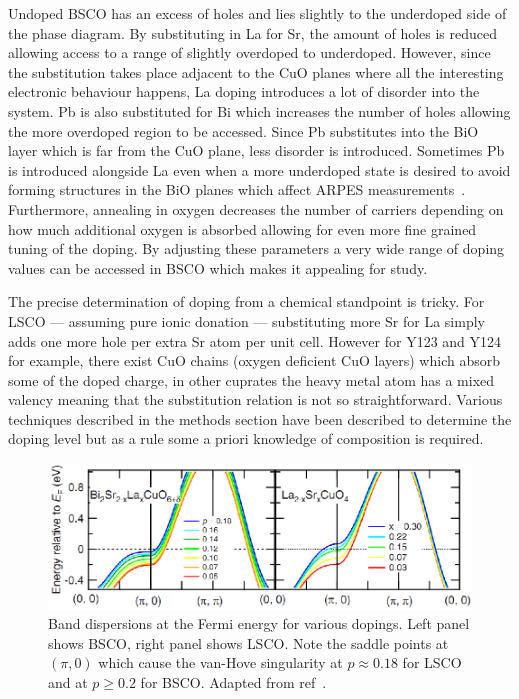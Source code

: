 Undoped \ac{BSCO} has an excess of holes and lies slightly to the underdoped side of the phase diagram. By substituting in La for Sr, the amount of holes is reduced allowing access to a range of slightly overdoped to underdoped. However, since the substitution takes place adjacent to the CuO planes where all the interesting electronic behaviour happens, La doping introduces a lot of disorder into the system. Pb is also substituted for Bi which increases the number of holes allowing the more overdoped region to be accessed. Since Pb substitutes into the BiO layer which is far from the CuO plane, less disorder is introduced. Sometimes Pb is introduced alongside La even when a more underdoped state is desired to avoid forming structures in the BiO planes which affect \ac{ARPES} measurements~\cite{Kondo2007}. Furthermore, annealing in oxygen decreases the number of carriers depending on how much additional oxygen is absorbed allowing for even more fine grained tuning of the doping. By adjusting these parameters a very wide range of doping values can be accessed in \ac{BSCO} which makes it appealing for study.

The precise determination of doping from a chemical standpoint is tricky. For \ac{LSCO} --- assuming pure ionic donation --- substituting more Sr for La simply adds one more hole per extra Sr atom per unit cell. However for \ac{Y123} and \ac{Y124} for example, there exist CuO chains (oxygen deficient CuO layers) which absorb some of the doped charge, in other cuprates the heavy metal atom has a mixed valency meaning that the substitution relation is not so straightforward. Various techniques described in the methods section have been described to determine the doping level but as a rule some a priori knowledge of composition is required.
\begin{figure}[htbp]
    \begin{center}
        \includegraphics[scale=1.0]{Chapter-Introduction/Figures/VanHoveBSCOLSCO/VanHoveBSCOLSCO}
        \caption{Band dispersions at the Fermi energy for various dopings. Left panel shows \ac{BSCO}, right panel shows \ac{LSCO}. Note the saddle points at $(\pi, 0)$ which cause the van-Hove singularity at $p\approx 0.18$ for \ac{LSCO} and at $p \geq 0.2$ for \ac{BSCO}. Adapted from ref~\cite{Hashimoto2008}.}
        \label{Fig:Intro:VanHoveBSCOLSCO}
    \end{center}
\end{figure}

